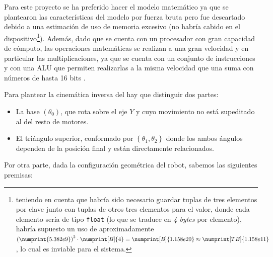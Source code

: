 Para este proyecto se ha preferido hacer el modelo matemático ya que se plantearon las
características del modelo por fuerza bruta pero fue descartado debido a una estimación de
uso de memoria excesivo (no habría cabido en el dispositivo\footnote{teniendo en cuenta
    que habría sido necesario guardar tuplas de tres elementos por clave junto con tuplas de
    otros tres elementos para el valor, donde cada elemento sería de tipo \texttt{float}
    (lo que se traduce en \textit{4 bytes} por elemento), habría supuesto un uso de
    aproximadamente $\left(\numprint{5.382e9}\right)^2 \cdot \numprint[B]{4} = \numprint[B]{1.158e20} \approx \numprint[TB]{1.158e11} $,
    lo cual es inviable para el sistema.}). Además, dado que se cuenta con un procesador
con gran capacidad de cómputo, las operaciones matemáticas se realizan a una gran velocidad
y en particular las multiplicaciones, ya que se cuenta con un conjunto de instrucciones y
con una \ac{ALU} que permiten realizarlas a la misma velocidad que una suma con números de hasta
16 bits \cite{microchipDsPIC33EPIC24EFRM2010}.

Para plantear la cinemática inversa del \pArm{} hay que distinguir dos partes:
\begin{itemize}
    \item La base $\left(\theta_0\right)$, que rota sobre el eje $Y$ y cuyo movimiento no está supeditado al
          del resto de motores.

    \item El triángulo superior, conformado por $\left\{\theta_1, \theta_2\right\}$ donde
          los ambos ángulos dependen de la posición final y están directamente relacionados.
\end{itemize}

Por otra parte, dada la configuración geométrica del robot, sabemos las siguientes premisas:

